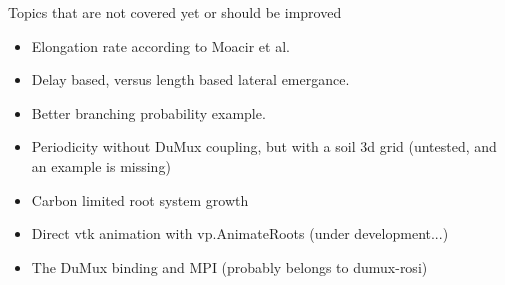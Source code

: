 
Topics that are not covered yet or should be improved

\begin{itemize}

\item Elongation rate according to Moacir et al.

\item Delay based, versus length based lateral emergance.

\item Better branching probability example.

\item Periodicity without DuMux coupling, but with a soil 3d grid (untested, and an example is missing)

\item Carbon limited root system growth

\item Direct vtk animation with vp.AnimateRoots (under development...)

\item The DuMux binding and MPI (probably belongs to dumux-rosi)


\end{itemize}

